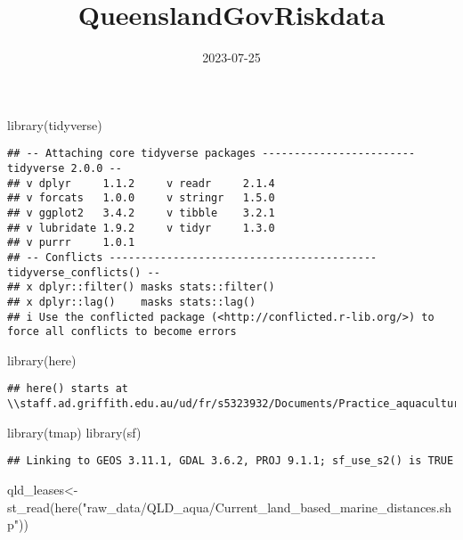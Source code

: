 \documentclass[
]{article}
\title{QueenslandGovRiskdata}
\author{}
\date{\vspace{-2.5em}2023-07-25}
\newenvironment{Shaded}{\begin{snugshade}}{\end{snugshade}}
\newcommand{\FunctionTok}[1]{\textcolor[rgb]{0.00,0.00,0.00}{#1}}
\newcommand{\NormalTok}[1]{#1}
\newcommand{\OtherTok}[1]{\textcolor[rgb]{0.56,0.35,0.01}{#1}}
\newcommand{\StringTok}[1]{\textcolor[rgb]{0.31,0.60,0.02}{#1}}
\begin{document}
\maketitle

\begin{Shaded}
\begin{Highlighting}[]
\FunctionTok{library}\NormalTok{(tidyverse)}
\end{Highlighting}
\end{Shaded}

\begin{verbatim}
## -- Attaching core tidyverse packages ------------------------ tidyverse 2.0.0 --
## v dplyr     1.1.2     v readr     2.1.4
## v forcats   1.0.0     v stringr   1.5.0
## v ggplot2   3.4.2     v tibble    3.2.1
## v lubridate 1.9.2     v tidyr     1.3.0
## v purrr     1.0.1     
## -- Conflicts ------------------------------------------ tidyverse_conflicts() --
## x dplyr::filter() masks stats::filter()
## x dplyr::lag()    masks stats::lag()
## i Use the conflicted package (<http://conflicted.r-lib.org/>) to force all conflicts to become errors
\end{verbatim}

\begin{Shaded}
\begin{Highlighting}[]
\FunctionTok{library}\NormalTok{(here)}
\end{Highlighting}
\end{Shaded}

\begin{verbatim}
## here() starts at \\staff.ad.griffith.edu.au/ud/fr/s5323932/Documents/Practice_aquaculture
\end{verbatim}

\begin{Shaded}
\begin{Highlighting}[]
\FunctionTok{library}\NormalTok{(tmap)}
\FunctionTok{library}\NormalTok{(sf)}
\end{Highlighting}
\end{Shaded}

\begin{verbatim}
## Linking to GEOS 3.11.1, GDAL 3.6.2, PROJ 9.1.1; sf_use_s2() is TRUE
\end{verbatim}

\begin{Shaded}
\begin{Highlighting}[]
\NormalTok{qld\_leases}\OtherTok{\textless{}{-}}\FunctionTok{st\_read}\NormalTok{(}\FunctionTok{here}\NormalTok{(}\StringTok{"raw\_data/QLD\_aqua/Current\_land\_based\_marine\_distances.shp"}\NormalTok{))}
\end{Highlighting}
\end{Shaded}
\end{document}
